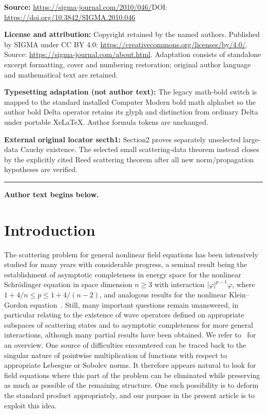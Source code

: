 \documentclass[11pt]{article}
\begin{document}
\noindent\textbf{Source:} \url{https://sigma-journal.com/2010/046/}\quad DOI: \url{https://doi.org/10.3842/SIGMA.2010.046}\par
\noindent\textbf{License and attribution:} Copyright retained by the named authors. Published by SIGMA under CC BY 4.0: \url{https://creativecommons.org/licenses/by/4.0/}. Source: \url{https://sigma-journal.com/about.html}. Adaptation consists of standalone excerpt formatting, cover and numbering restoration; original author language and mathematical text are retained.\par
\noindent\textbf{Typesetting adaptation (not author text):} The legacy math-bold switch is mapped to the standard installed Computer Modern bold math alphabet so the author bold Delta operator retains its glyph and distinction from ordinary Delta under portable XeLaTeX. Author formula tokens are unchanged.\par
\noindent\textbf{External original locator secth1:} Section2 proves separately unselected large-data Cauchy existence. The selected small scattering-data theorem instead closes by the explicitly cited Reed scattering theorem after all new norm/propagation hypotheses are verified.\par
\medskip\hrule\medskip\noindent\textbf{Author text begins below.}\par
\setcounter{section}{0}
\setcounter{subsection}{0}
\setcounter{subsubsection}{0}
\setcounter{equation}{0}
\section{Introduction}

The scattering problem for general nonlinear
f\/ield equations has been intensively studied for many years with
considerable progress, a seminal result being the establishment of
asymptotic completeness in energy space for the
nonlinear Schr{\"o}dinger equation in space dimension \mbox{$n\geq 3$} with
interaction $|\varphi|^{p-1}\varphi$, where
$1+4/n\leq p\leq 1+4/(n-2)$, and analogous results for the nonlinear Klein--Gordon
equation~\cite{GiVe}. Still, many important questions remain
unanswered, in particular relating to the existence of wave operators
def\/ined on appropriate subspaces of scattering states and to
asymptotic completeness for more general interactions, although many
partial results have been obtained. We refer to~\cite{Strauss,Ginibre} for an overview.
One source of dif\/f\/iculties encountered can be traced back to the
singular nature of pointwise
multiplication of functions with respect to appropriate Lebesgue or
Sobolev norms. It therefore appears natural to look for f\/ield equations where
this part of the problem can be eliminated while preserving as much
as possible of the remaining structure. One such possibility
is to deform the standard product appropriately, and  our
purpose  in the present article is to exploit this idea.
\end{document}
